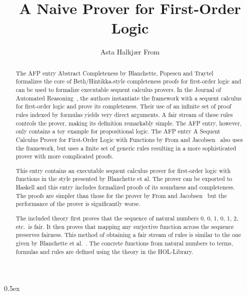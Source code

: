 \documentclass[11pt,a4paper]{article}
\begin{document}
\title{A Naive Prover for First-Order Logic}
\author{Asta Halkjær From}
\maketitle

\begin{abstract}
	The AFP entry Abstract Completeness by Blanchette, Popescu and Traytel~\cite{Abstract-Completeness-AFP} formalizes the core of Beth/Hintikka-style completeness proofs for first-order logic and can be used to formalize executable sequent calculus provers.
	In the Journal of Automated Reasoning~\cite{BlanchettePT17}, the authors instantiate the framework with a sequent calculus for first-order logic and prove its completeness.
	Their use of an infinite set of proof rules indexed by formulas yields very direct arguments.
	A fair stream of these rules controls the prover, making its definition remarkably simple.
	The AFP entry, however, only contains a toy example for propositional logic.
	The AFP entry A Sequent Calculus Prover for First-Order Logic with Functions by From and Jacobsen~\cite{FOL-Seq-Calc2-AFP} also uses the framework, but uses a finite set of generic rules resulting in a more sophisticated prover with more complicated proofs.

	This entry contains an executable sequent calculus prover for first-order logic with functions in the style presented by Blanchette et al.
	The prover can be exported to Haskell and this entry includes formalized proofs of its soundness and completeness.
	The proofs are simpler than those for the prover by From and Jacobsen~\cite{FOL-Seq-Calc2-AFP} but the performance of the prover is significantly worse.

	The included theory  first proves that the sequence of natural numbers 0, 0, 1, 0, 1, 2, etc.\ is fair.
	It then proves that mapping any surjective function across the sequence preserves fairness.
	This method of obtaining a fair stream of rules is similar to the one given by Blanchette et al.~\cite{BlanchettePT17}.
	The concrete functions from natural numbers to terms, formulas and rules are defined using the  theory in the HOL-Library.
\end{abstract}

\newpage

\tableofcontents

\newpage

\parindent 0pt\parskip 0.5ex





\end{document}
